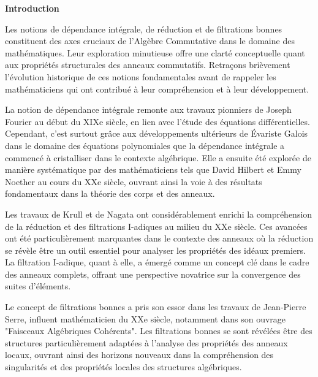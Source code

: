 \newpage
\tableofcontents
\renewcommand{\contentsname}{Table des matières}
\thispagestyle{empty}

\newpage

\setcounter{page}{0} 
\thispagestyle{empty}
\begin{center}
	\LARGE{\textbf{Introduction}}
\end{center}
\vspace{1cm}

Les notions de dépendance intégrale, de réduction et de filtrations bonnes constituent des axes cruciaux de l'Algèbre Commutative dans le domaine des mathématiques. Leur exploration minutieuse offre une clarté conceptuelle quant aux propriétés structurales des anneaux commutatifs. Retraçons brièvement l'évolution historique de ces notions fondamentales avant de rappeler les mathématiciens qui ont contribué à leur compréhension et à leur développement.

La notion de dépendance intégrale remonte aux travaux pionniers de Joseph Fourier au début du XIXe siècle, en lien avec l'étude des équations différentielles. Cependant, c'est surtout grâce aux développements ultérieurs de Évariste Galois dans le domaine des équations polynomiales que la dépendance intégrale a commencé à cristalliser dans le contexte algébrique. Elle a ensuite été explorée de manière systématique par des mathématiciens tels que David Hilbert et Emmy Noether au cours du XXe siècle, ouvrant ainsi la voie à des résultats fondamentaux dans la théorie des corps et des anneaux.

Les travaux de Krull et de Nagata ont considérablement enrichi la compréhension de la réduction et des filtrations I-adiques au milieu du XXe siècle. Ces avancées ont été particulièrement marquantes dans le contexte des anneaux où la réduction se révèle être un outil essentiel pour analyser les propriétés des idéaux premiers. La filtration I-adique, quant à elle, a émergé comme un concept clé dans le cadre des anneaux complets, offrant une perspective novatrice sur la convergence des suites d'éléments.

Le concept de filtrations bonnes a pris son essor dans les travaux de Jean-Pierre Serre, influent mathématicien du XXe siècle, notamment dans son ouvrage "Faisceaux Algébriques Cohérents". Les filtrations bonnes se sont révélées être des structures particulièrement adaptées à l'analyse des propriétés des anneaux locaux, ouvrant ainsi des horizons nouveaux dans la compréhension des singularités et des propriétés locales des structures algébriques.

